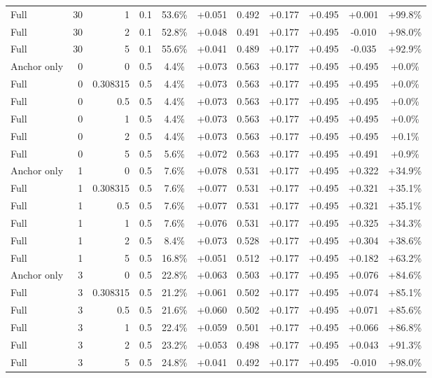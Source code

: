 \begin{table}[htbp]
\begin{tabular}{lrrrccccccc}
Full & 30 & 1 & 0.1 & 53.6\% & +0.051 & 0.492 & +0.177 & +0.495 & +0.001 & +99.8\% \\
Full & 30 & 2 & 0.1 & 52.8\% & +0.048 & 0.491 & +0.177 & +0.495 & -0.010 & +98.0\% \\
Full & 30 & 5 & 0.1 & 55.6\% & +0.041 & 0.489 & +0.177 & +0.495 & -0.035 & +92.9\% \\
Anchor only & 0 & 0 & 0.5 & 4.4\% & +0.073 & 0.563 & +0.177 & +0.495 & +0.495 & +0.0\% \\
Full & 0 & 0.308315 & 0.5 & 4.4\% & +0.073 & 0.563 & +0.177 & +0.495 & +0.495 & +0.0\% \\
Full & 0 & 0.5 & 0.5 & 4.4\% & +0.073 & 0.563 & +0.177 & +0.495 & +0.495 & +0.0\% \\
Full & 0 & 1 & 0.5 & 4.4\% & +0.073 & 0.563 & +0.177 & +0.495 & +0.495 & +0.0\% \\
Full & 0 & 2 & 0.5 & 4.4\% & +0.073 & 0.563 & +0.177 & +0.495 & +0.495 & +0.1\% \\
Full & 0 & 5 & 0.5 & 5.6\% & +0.072 & 0.563 & +0.177 & +0.495 & +0.491 & +0.9\% \\
Anchor only & 1 & 0 & 0.5 & 7.6\% & +0.078 & 0.531 & +0.177 & +0.495 & +0.322 & +34.9\% \\
Full & 1 & 0.308315 & 0.5 & 7.6\% & +0.077 & 0.531 & +0.177 & +0.495 & +0.321 & +35.1\% \\
Full & 1 & 0.5 & 0.5 & 7.6\% & +0.077 & 0.531 & +0.177 & +0.495 & +0.321 & +35.1\% \\
Full & 1 & 1 & 0.5 & 7.6\% & +0.076 & 0.531 & +0.177 & +0.495 & +0.325 & +34.3\% \\
Full & 1 & 2 & 0.5 & 8.4\% & +0.073 & 0.528 & +0.177 & +0.495 & +0.304 & +38.6\% \\
Full & 1 & 5 & 0.5 & 16.8\% & +0.051 & 0.512 & +0.177 & +0.495 & +0.182 & +63.2\% \\
Anchor only & 3 & 0 & 0.5 & 22.8\% & +0.063 & 0.503 & +0.177 & +0.495 & +0.076 & +84.6\% \\
Full & 3 & 0.308315 & 0.5 & 21.2\% & +0.061 & 0.502 & +0.177 & +0.495 & +0.074 & +85.1\% \\
Full & 3 & 0.5 & 0.5 & 21.6\% & +0.060 & 0.502 & +0.177 & +0.495 & +0.071 & +85.6\% \\
Full & 3 & 1 & 0.5 & 22.4\% & +0.059 & 0.501 & +0.177 & +0.495 & +0.066 & +86.8\% \\
Full & 3 & 2 & 0.5 & 23.2\% & +0.053 & 0.498 & +0.177 & +0.495 & +0.043 & +91.3\% \\
Full & 3 & 5 & 0.5 & 24.8\% & +0.041 & 0.492 & +0.177 & +0.495 & -0.010 & +98.0\% \\

\end{tabular}
\end{table}

